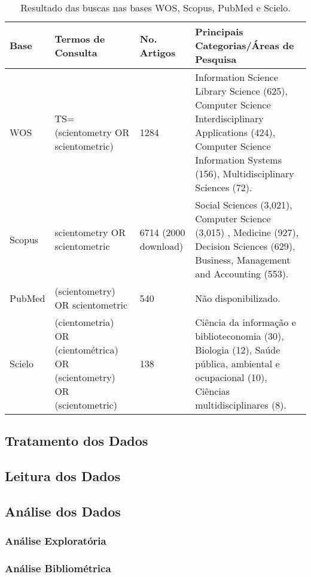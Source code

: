 \documentclass[
	article,			%
	11pt,				%
	oneside,			%
	a4paper,			%
	english,			%
	brazil,				%
	sumario=tradicional
	]{abntex2}
\begin{document}
\begin{table}[!tp]
\caption{Resultado das buscas nas bases WOS, Scopus, PubMed e Scielo.} \label{tab:resultadoPesquisa}
\centering
\begin{tabular}{|p{1.3cm}|p{3cm}|p{1.5cm}|p{7.5cm}|}
  \hline
 \textbf{ Base} & \textbf{Termos de Consulta} &\textbf{No. Artigos} & \textbf{Principais Categorias/Áreas de Pesquisa} \\ \hline%
  WOS   & TS=(scientometry OR scientometric) & 1284 & Information Science Library Science (625), Computer Science Interdisciplinary Applications (424), Computer Science Information Systems (156), Multidisciplinary Sciences (72).\\ \hline
   Scopus & scientometry  OR  scientometric  & 6714 (2000 download) & Social Sciences (3,021), Computer Science (3,015) , Medicine (927), Decision Sciences (629), Business, Management and Accounting (553). \\ \hline
   PubMed & (scientometry) OR scientometric  & 540 & Não disponibilizado.  \\ \hline
   Scielo & (cientometria) OR (cientométrica) OR (scientometry) OR (scientometric) & 138 &  Ciência da informação e biblioteconomia (30), Biologia (12), Saúde pública, ambiental e ocupacional (10), Ciências multidisciplinares (8).\\ \hline
\end{tabular}
\end{table}

\subsection{Tratamento dos Dados}

\subsection{Leitura dos Dados}

\subsection{Análise dos Dados}

\subsubsection{Análise Exploratória}

\subsubsection{Análise Bibliométrica}
\end{document}
